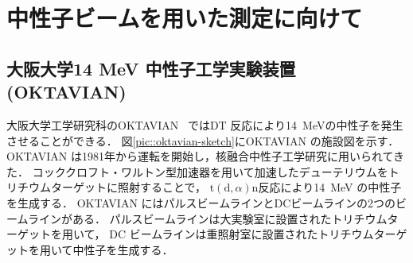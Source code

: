 \documentclass[../master]{subfiles}
\begin{document}
\chapter{中性子ビームを用いた測定に向けて}
\label{chap::experiment}
\section{大阪大学14 MeV 中性子工学実験装置 (OKTAVIAN)}
大阪大学工学研究科のOKTAVIAN~\cite{oktavian} ではDT 反応により\SI{14}{\mega\electronvolt}の中性子を発生させることができる．
図\ref{pic::oktavian-sketch}にOKTAVIAN の施設図を示す．
OKTAVIAN は1981年から運転を開始し，核融合中性子工学研究に用いられてきた．
コッククロフト・ワルトン型加速器を用いて加速したデューテリウムをトリチウムターゲットに照射することで，
$\mathrm{t}(\mathrm{d},\alpha)\mathrm{n}$反応により\SI{14}{\mega\electronvolt} の中性子を生成する．
OKTAVIAN にはパルスビームラインとDCビームラインの2つのビームラインがある．
パルスビームラインは大実験室に設置されたトリチウムターゲットを用いて，
DC ビームラインは重照射室に設置されたトリチウムターゲットを用いて中性子を生成する．
\end{document}
